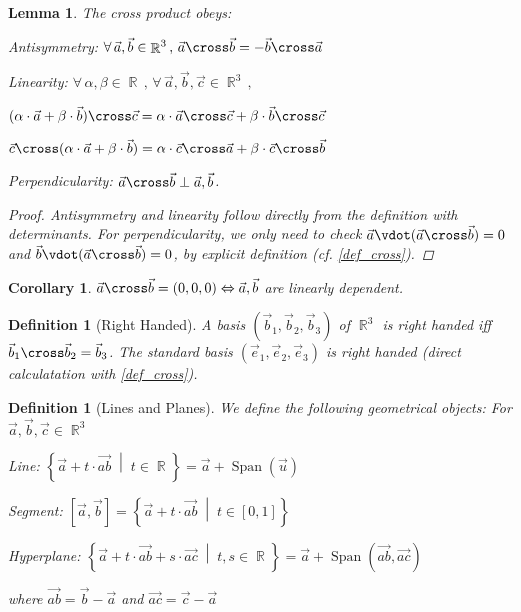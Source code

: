 \documentclass[12pt]{article}
\let\LR\Leftrightarrow
\DeclareMathOperator{\Span}{Span}
\newcommand{\set}[2]{\left\{{#1}\;\middle|\;{#2}\right\}}
\newcommand{\Forall}[1]{\forall\,{#1}\,,\,}
\DeclareMathOperator{\R}{\mathbb{R}}
\newtheorem{definition}[theorem]{Definition}
\newtheorem{lemma}[theorem]{Lemma}
\newtheorem{corollary}[theorem]{Corollary}
\begin{document}
\begin{lemma}
  The cross product obeys:
  \begin{compactitem}
    \item[] Antisymmetry: $\Forall{\vec{a},\vec{b}\in\R^3} \vec{a}\cross \vec{b} = - \vec{b}\cross \vec{a}$
    \item[] Linearity: $\Forall{\alpha,\beta\in\R}\Forall{\vec{a},\vec{b},\vec{c}\in\R^3}$ \begin{compactitem}
      \item[] $(\alpha\cdot\vec{a}+\beta\cdot\vec{b})\cross\vec{c}=\alpha\cdot\vec{a}\cross \vec{c}+\beta\cdot\vec{b}\cross\vec{c}$ 
      \item[] $\vec{c}\cross(\alpha\cdot\vec{a}+\beta\cdot\vec{b})=\alpha\cdot\vec{c}\cross\vec{a}+\beta\cdot\vec{c}\cross\vec{b}$
    \end{compactitem}
    \item[] Perpendicularity: $\vec{a}\cross\vec{b} \perp \vec{a},\vec{b}$. 
  \end{compactitem}
  \begin{proof}
    Antisymmetry and linearity follow directly from the definition with determinants. For perpendicularity, we only need to check $\vec{a}\vdot (\vec{a}\cross\vec{b})= 0$ and $\vec{b}\vdot (\vec{a}\cross\vec{b})=0$, by explicit definition (cf. \ref{def_cross}).
  \end{proof}
\end{lemma}

\begin{corollary}
  $\vec{a}\cross\vec{b}=(0,0,0)\LR \vec{a},\vec{b}$ are linearly dependent.
\end{corollary}

\begin{definition}[Right Handed]
  A basis $(\vec{b}_1,\vec{b}_2,\vec{b}_3)$ of $\R^3$ is right handed iff $\vec{b}_1\cross \vec{b}_2=\vec{b}_3$. The standard basis $(\vec{e}_1,\vec{e}_2,\vec{e}_3)$ is right handed (direct calculatation with \ref{def_cross}).
\end{definition}

\begin{definition}[Lines and Planes]
  We define the following geometrical objects: For $\vec{a},\vec{b},\vec{c}\in\R^3$
  \begin{compactitem}
    \item Line: $\set{\vec{a}+t\cdot\vec{ab}}{t\in\R}=\vec{a}+\Span(\vec{u})$
    \item Segment: $[\vec{a},\vec{b}]=\set{\vec{a}+t\cdot\vec{ab}}{t\in[0,1]}$
    \item Hyperplane: $\set{\vec{a}+t\cdot\vec{ab}+s\cdot\vec{ac}}{t,s\in\R}=\vec{a}+\Span(\vec{ab},\vec{ac})$
  \end{compactitem}
  where $\vec{ab}=\vec{b}-\vec{a}$ and $\vec{ac}=\vec{c}-\vec{a}$
\end{definition}
\end{document}
